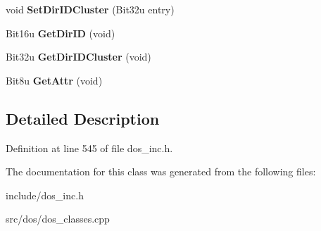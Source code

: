 \begin{DoxyCompactItemize}
\item 
\hypertarget{classDOS__DTA_a6234b76041d9cf7514103fe72ce2bb67}{void {\bfseries Set\-Dir\-I\-D\-Cluster} (Bit32u entry)}\label{classDOS__DTA_a6234b76041d9cf7514103fe72ce2bb67}

\item 
\hypertarget{classDOS__DTA_ac6562d1dd41f1f2b0874647e82a62289}{Bit16u {\bfseries Get\-Dir\-I\-D} (void)}\label{classDOS__DTA_ac6562d1dd41f1f2b0874647e82a62289}

\item 
\hypertarget{classDOS__DTA_a54c6b82def7f8b77092dd05293448125}{Bit32u {\bfseries Get\-Dir\-I\-D\-Cluster} (void)}\label{classDOS__DTA_a54c6b82def7f8b77092dd05293448125}

\item 
\hypertarget{classDOS__DTA_a2a46e3772a422180a20895e706613ff5}{Bit8u {\bfseries Get\-Attr} (void)}\label{classDOS__DTA_a2a46e3772a422180a20895e706613ff5}

\end{DoxyCompactItemize}


\subsection{Detailed Description}


Definition at line 545 of file dos\-\_\-inc.\-h.



The documentation for this class was generated from the following files\-:\begin{DoxyCompactItemize}
\item 
include/dos\-\_\-inc.\-h\item 
src/dos/dos\-\_\-classes.\-cpp\end{DoxyCompactItemize}
